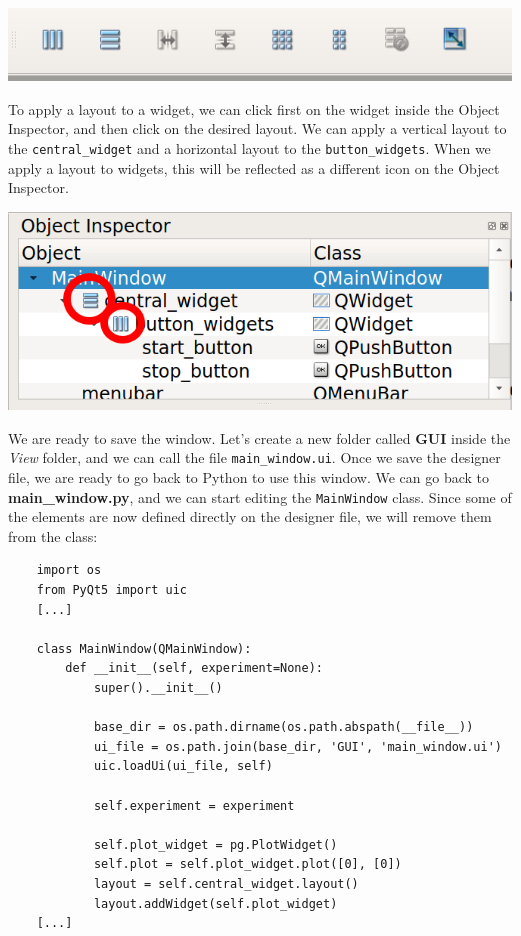 \begin{center}
    \includegraphics[width=.4\textwidth]{images/Chapter_09/06_layouts.png}
\end{center}

To apply a layout to a widget, we can click first on the widget inside the Object Inspector, and then click on the desired layout. We can apply a vertical layout to the \texttt{central\_widget} and a horizontal layout to the \texttt{button\_widgets}. When we apply a layout to widgets, this will be reflected as a different icon on the Object Inspector.

\begin{center}
    \includegraphics[width=.4\textwidth]{images/Chapter_09/07_widgets_with_layouts.png}
\end{center}

We are ready to save the window. Let's create a new folder called \textbf{GUI} inside the \emph{View} folder, and we can call the file \texttt{main\_window.ui}. Once we save the designer file, we are ready to go back to Python to use this window. We can go back to \textbf{main\_window.py}, and we can start editing the \texttt{MainWindow} class. Since some of the elements are now defined directly on the designer file, we will remove them from the class:

\begin{verbatim}
    import os
    from PyQt5 import uic
    [...]

    class MainWindow(QMainWindow):
        def __init__(self, experiment=None):
            super().__init__()

            base_dir = os.path.dirname(os.path.abspath(__file__))
            ui_file = os.path.join(base_dir, 'GUI', 'main_window.ui')
            uic.loadUi(ui_file, self)

            self.experiment = experiment

            self.plot_widget = pg.PlotWidget()
            self.plot = self.plot_widget.plot([0], [0])
            layout = self.central_widget.layout()
            layout.addWidget(self.plot_widget)
    [...]
\end{verbatim}

